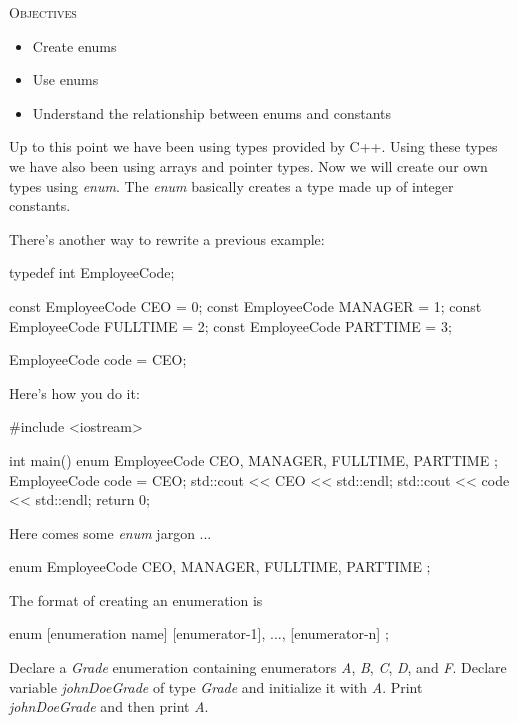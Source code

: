 \newpage{}

\textsc{Objectives}
\begin{itemize}
\item Create enums
\item Use enums
\item Understand the relationship between enums and constants
\end{itemize}

Up to this point we have been using types provided by C++. Using these
types we have also been using arrays and pointer types. Now we will
create our own types using \textit{enum}. The \textit{enum} basically
creates a type made up of integer constants.


\newpage{}

There's another way to rewrite a previous example:

\begin{consolethree}[escapeinside=||]
typedef int EmployeeCode;

const EmployeeCode CEO = 0;
const EmployeeCode MANAGER = 1;
const EmployeeCode FULLTIME = 2;
const EmployeeCode PARTTIME = 3;

EmployeeCode code = CEO;
\end{consolethree}

Here's how you do it:

\begin{consolethree}[escapeinside=||]
#include <iostream>

int main()
{
    enum EmployeeCode
    {
        CEO, MANAGER, FULLTIME, PARTTIME
    };
    EmployeeCode code = CEO;
    std::cout << CEO << std::endl;
    std::cout << code << std::endl;
    return 0;
}
\end{consolethree}

Here comes some \textit{enum} jargon ...

\begin{consolethree}[escapeinside=||]
enum EmployeeCode
{
    CEO, MANAGER, FULLTIME, PARTTIME
};
\end{consolethree}

The format of creating an enumeration is

\begin{consolethree}[escapeinside=||]
enum [enumeration name]
{
    [enumerator-1], ...,
    [enumerator-n]
};
\end{consolethree}

\begin{ex}
Declare a \textit{Grade} enumeration containing
enumerators \textit{A}, \textit{B}, \textit{C}, \textit{D}, and \textit{F}.
Declare variable \textit{johnDoeGrade} of type \textit{Grade} and initialize
it with \textit{A}. Print \textit{johnDoeGrade} and then print \textit{A}.
\end{ex}


